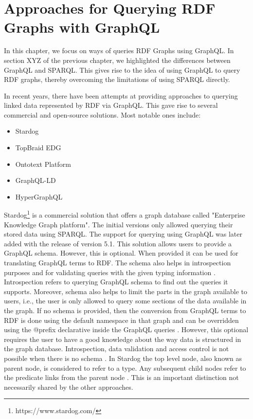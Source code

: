 \chapter{Approaches for Querying RDF Graphs with GraphQL}

In this chapter, we focus on ways of queries RDF Graphs using GraphQL. In section XYZ of the previous chapter, we highlighted the differences between GraphQL and SPARQL. This gives rise to the idea of using GraphQL to query RDF graphs, thereby overcoming the limitations of using SPARQL directly.

In recent years, there have been attempts at providing approaches to querying linked data represented by RDF via GraphQL. This gave rise to several commercial and open-source solutions. Most notable ones include:

\begin{itemize}
	\item Stardog
	\item TopBraid EDG
	\item Ontotext Platform
	\item GraphQL-LD
	\item HyperGraphQL

\end{itemize}

Stardog\footnote{https://www.stardog.com/} is a commercial solution that offers a graph database called "Enterprise Knowledge Graph platform"\cite{Angele2022}. The initial versions only allowed querying their stored data using SPARQL. The support for querying using GraphQL was later added with the release of version 5.1. This solution allows users to provide a GraphQL schema. However, this is optional. When provided it can be used for translating GraphQL terms to RDF. The schema also helps in introspection purposes and for validating queries with the given typing information \cite{Gleim2020}. Introspection refers to querying GraphQL schema to find out the queries it supports. Moreover, schema also helps to limit the parts in the graph available to users, i.e., the user is only allowed to query some sections of the data available in the graph. If no schema is provided, then the conversion from GraphQL terms to RDF is done using the default namespace in that graph and can be overridden using the @prefix declarative inside the GraphQL queries \cite{Taelman2019}. However, this optional requires the user to have a good knowledge about the way data is structured in the graph database. Introspection, data validation and access control is not possible when there is no schema \cite{Gleim2020}. In Stardog the top level node, also known as parent node, is considered to refer to a type. Any subsequent child nodes refer to the predicate links from the parent node \cite{Taelman2019}. This is an important distinction not necessarily shared by the other approaches.


